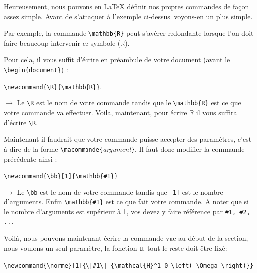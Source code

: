 \documentclass[11pt]{article}				%
\newcommand{\tb}{\textbackslash}
\newcommand{\cmdo}[3][]{\texttt{\textbackslash #2}\texttt{[#1}\texttt{]\{#3\}}}
\newcommand{\cmd}[2]{\texttt{\textbackslash #1}\texttt{\{#2\}}}
\newcommand{\cmdi}[2]{\texttt{\textbackslash #1}\texttt{\{}\textit{#2}\texttt{\}}}
\begin{document}
Heureusement, nous pouvons en LaTeX définir nos propres commandes de façon assez simple. Avant de s'attaquer à l'exemple ci-dessus, voyons-en un plus simple.

Par exemple, la commande \cmd{mathbb}{R} peut s'avérer redondante lorsque l'on doit faire beaucoup intervenir ce symbole ($ \mathbb{R} $).

Pour cela, il vous suffit d'écrire en préambule de votre document (avant le \cmd{begin}{document}) : 
\begin{multicols}{2}

\begin{center}
	\cmd{newcommand\{\tb R\}}{\tb mathbb\{R\}}.
\end{center}
 
\columnbreak

$\rightarrow$ Le \verb|\R| est le nom de votre commande tandis que le \cmd{mathbb}{R} est ce que votre commande va effectuer. Voila, maintenant, pour écrire $ \mathbb{R} $ il vous suffira d'écrire \verb|\R|.\\
\end{multicols}

Maintenant il faudrait que votre commande puisse accepter des paramètres, c'est à dire de la forme \cmdi{macommande}{argument}. Il faut donc modifier la commande précédente ainsi :

\begin{multicols}{2}
	
	\begin{center}
		\cmdo[1]{newcommand\{\tb bb\}}{\tb mathbb\{\#1\}}
	\end{center}
	
	\columnbreak
	
	$\rightarrow$ Le \verb|\bb| est le nom de votre commande tandis que \verb|[1]| est le nombre d'arguments. Enfin \cmd{mathbb}{\#1} est ce que fait votre commande. A noter que si le nombre d'arguments est supérieur à 1, vos devez y faire référence par \verb|#1, #2, ...| 
\end{multicols}

Voilà, nous pouvons maintenant écrire la commande vue au début de la section, nous voulons un seul paramètre, la fonction \texttt{u}, tout le reste doit être fixé:
\newcommand{\norme}[1]{\|#1\|_{\mathcal{H}^1_0\left(\Omega\right)}}
\begin{center}
	\cmdo[1]{newcommand\{\tb norme\}}{\tb |\#1\tb|{\_}\{\cmd{mathcal}{H}\textasciicircum 1\_0 \tb left( \tb Omega \tb right)\}} \\
\end{center}
\end{document}
